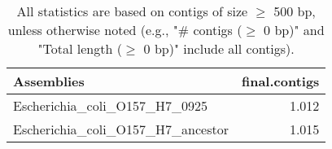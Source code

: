 \documentclass[12pt,a4paper]{article}
\begin{document}
\begin{table}[ht]
\begin{center}
\caption{All statistics are based on contigs of size $\geq$ 500 bp, unless otherwise noted (e.g., "\# contigs ($\geq$ 0 bp)" and "Total length ($\geq$ 0 bp)" include all contigs).}
\begin{tabular}{|l*{1}{|r}|}
\hline
Assemblies & final.contigs \\ \hline
Escherichia\_coli\_O157\_H7\_0925 & 1.012 \\ \hline
Escherichia\_coli\_O157\_H7\_ancestor & 1.015 \\ \hline
\end{tabular}
\end{center}
\end{table}
\end{document}
